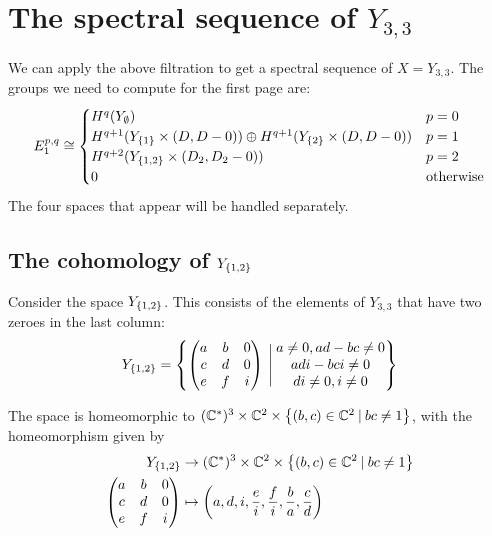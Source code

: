 \section{The spectral sequence of $Y_{3,3}$}
\label{sec:ss33}

We can apply the above filtration to get a spectral sequence of
$X=Y_{3,3}$. The groups we need to compute for the first page are:
\[ E_1^{p,q} \cong
\begin{cases}
  H^{q}(Y_\emptyset) & p=0 \\
  H^{q+1}(Y_{\left\{ 1 \right\}} \times (D,D-0)) \oplus H^{q+1}(Y_{\left\{ 2 \right\}} \times
  (D,D-0)) & p=1 \\
  H^{q+2}(Y_{\left\{ 1,2 \right\}}\times (D_2,D_2-0)) & p = 2 \\
  0 & \text{otherwise}
\end{cases} \]
The four spaces that appear will be handled separately.

\subsection{The cohomology of $Y_{\left\{ 1,2 \right\}}$}

Consider the space $Y_{\left\{ 1,2 \right\}}$. This consists of the elements of
$Y_{3,3}$ that have two zeroes in the last column:
\[ Y_{\left\{ 1,2 \right\}} = \left\{ 
  \begin{pmatrix}
    a & b & 0 \\
    c & d & 0 \\
    e & f & i
  \end{pmatrix} \:\Bigg\vert\:
  \begin{matrix}
    a \neq 0, ad-bc \neq 0 \\
    adi-bci \neq 0 \\
    di \neq 0, i \neq 0
  \end{matrix}
 \right\} \]

The space is homeomorphic to $(\mathbb{C}^*)^3\times \mathbb{C}^2
\times \left\{ (b,c)\in\mathbb{C}^2 \: \vert \: bc\neq 1 \right\}$, with the
homeomorphism given by
\begin{align*}
  Y_{\left\{ 1,2 \right\}} &\to (\mathbb{C}^*)^3\times \mathbb{C}^2
  \times \left\{ (b,c)\in\mathbb{C}^2 \: \vert \: bc\neq 1 \right\} \\
  \begin{pmatrix}
    a & b & 0 \\
    c & d & 0 \\
    e & f & i
  \end{pmatrix} &\mapsto \left(a,d,i,\frac{e}{i},\frac{f}{i},
    \frac{b}{a}, \frac{c}{d}\right)
\end{align*}

